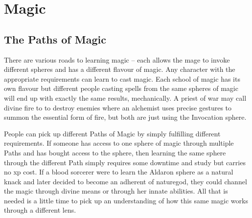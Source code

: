 \chapter{Magic}
\label{magic_paths}

\section{The Paths of Magic}

\begin{multicols}{2}

\noindent
There are various roads to learning magic -- each allows the mage to invoke different spheres and has a different flavour of magic.
Any character with the appropriate requirements can learn to cast magic.
Each school of magic has its own flavour but different people casting spells from the same spheres of magic will end up with exactly the same results, mechanically.
A priest of war may call divine fire to to destroy enemies where an alchemist uses precise gestures to summon the essential form of fire, but both are just using the Invocation sphere.

People can pick up different Paths of Magic by simply fulfilling different requirements.
If someone has access to one sphere of magic through multiple Paths and has bought access to the sphere, then learning the same sphere through the different Path simply requires some \gls{downtime} and study but carries no \gls{xp} cost.
If a blood sorcerer were to learn the Aldaron sphere as a natural knack and later decided to become an adherent of \gls{naturegod}, they could channel the magic through divine means or through her innate abilities.
All that is needed is a little time to pick up an understanding of how this same magic works through a different lens.

\end{multicols}

